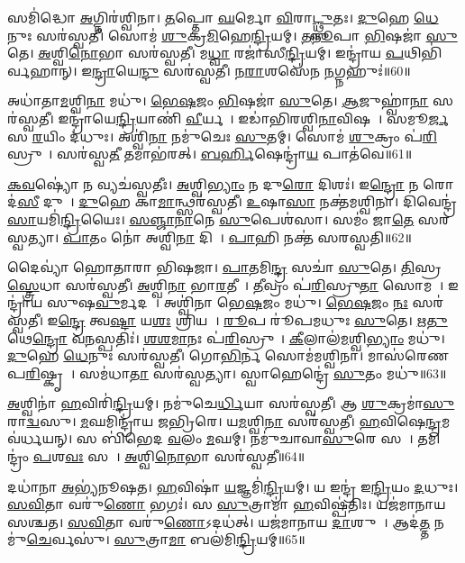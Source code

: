 𑌸𑌮𑌿॑𑌦𑍍𑌧𑍋 \ul{𑌅}𑌗𑍍𑌨𑌿𑌰॑𑌶𑍍𑌵𑌿𑌨𑌾।
\ul{𑌤}𑌪𑍍𑌤𑍋 \ul{𑌘}𑌰𑍍𑌮𑍋 \ul{𑌵𑌿}𑌰𑌾\ul{𑌟𑍍𑌥𑍍𑌸𑍁}𑌤𑌃।
\ul{𑌦𑍁}𑌹𑍇 \ul{𑌧𑍇}𑌨𑍁𑌃 𑌸𑌰॑𑌸𑍍𑌵𑌤𑍀।
𑌸𑍋𑌮॑ \ul{𑌶𑍁}𑌕𑍍𑌰\ul{𑌮𑌿}𑌹𑍇\ul{𑌨𑍍𑌦𑍍𑌰𑌿}𑌯𑌮𑍍।
\ul{𑌤}\ul{𑌨𑍂}𑌪𑌾 \ul{𑌭𑌿}𑌷𑌜𑌾॑ \ul{𑌸𑍁}𑌤𑍇।
\ul{𑌅}𑌶𑍍𑌵𑌿\ul{𑌨𑍋}𑌭𑌾 𑌸𑌰॑𑌸𑍍𑌵𑌤𑍀।
𑌮\ul{𑌧𑍍𑌵𑌾} 𑌰𑌜𑌾॑𑌸𑍀\ul{𑌨𑍍𑌦𑍍𑌰𑌿}𑌯𑌮𑍍।
𑌇𑌨𑍍𑌦𑍍𑌰𑌾॑𑌯 \ul{𑌪}𑌥𑌿𑌭𑌿॑𑌰𑍍𑌵𑌹𑌾𑌨𑍍।
𑌇\ul{𑌨𑍍𑌦𑍍𑌰𑌾}𑌯𑍇\ul{𑌨𑍍𑌦𑍁}\ul{} 𑌸𑌰॑𑌸𑍍𑌵𑌤𑍀।
𑌨\ul{𑌰𑌾}𑌶𑌸𑍇॑𑌨 \ul{𑌨}𑌗𑍍𑌨𑌹𑍁𑌃॑॥60॥

𑌅𑌧𑌾॑𑌤𑌾\ul{𑌮}𑌶𑍍𑌵𑌿\ul{𑌨𑌾} 𑌮𑌧𑍁॑।
\ul{𑌭𑍇}\ul{𑌷}𑌜𑌂 \ul{𑌭𑌿}𑌷𑌜𑌾॑ \ul{𑌸𑍁}𑌤𑍇।
\ul{𑌆}𑌜𑍁𑌹𑍍𑌵𑌾॑\ul{𑌨𑌾} 𑌸𑌰॑𑌸𑍍𑌵𑌤𑍀।
𑌇𑌨𑍍𑌦𑍍𑌰𑌾॑𑌯𑍇\ul{𑌨𑍍𑌦𑍍𑌰𑌿}𑌯𑌾𑌣𑌿॑ \ul{𑌵𑍀}𑌰𑍍𑌯𑌮𑍍᳚।
𑌇𑌡𑌾॑𑌭𑌿𑌰𑌶𑍍𑌵𑌿\ul{𑌨𑌾}𑌵𑌿𑌷𑌮𑍍᳚।
𑌸𑌮𑍂\ul{𑌰𑍍𑌜}\ul{} 𑌸 \ul{𑌰}𑌯𑌿𑌂 𑌦॑𑌧𑍁𑌃।
𑌅𑌶𑍍𑌵𑌿॑\ul{𑌨𑌾} 𑌨𑌮𑍁॑𑌚𑍇𑌃 \ul{𑌸𑍁}𑌤𑌮𑍍।
𑌸𑍋𑌮॑ \ul{𑌶𑍁}𑌕𑍍𑌰𑌂 𑌪॑\ul{𑌰𑌿}𑌸𑍍𑌰𑍁𑌤𑌾᳚।
𑌸𑌰॑𑌸𑍍𑌵\ul{𑌤𑍀} 𑌤𑌮𑌾𑌭॑𑌰𑌤𑍍।
\ul{𑌬}\ul{𑌰𑍍}𑌹𑌿𑌷𑍇𑌨𑍍𑌦𑍍𑌰𑌾॑\ul{𑌯} 𑌪𑌾𑌤॑𑌵𑍇॥61॥

\ul{𑌕}\ul{𑌵}𑌷𑍍𑌯𑍋॑ 𑌨 𑌵𑍍𑌯𑌚॑𑌸𑍍𑌵𑌤𑍀𑌃।
\ul{𑌅}𑌶𑍍𑌵𑌿\ul{𑌭𑍍𑌯𑌾𑌂} 𑌨 𑌦𑍁\ul{𑌰𑍋} 𑌦𑌿𑌶𑌃॑।
𑌇\ul{𑌨𑍍𑌦𑍍𑌰𑍋} 𑌨 𑌰𑍋𑌦॑\ul{𑌸𑍀} 𑌦𑍁𑌘𑍇᳚।
\ul{𑌦𑍁}𑌹𑍇 𑌕𑌾\ul{𑌮𑌾}𑌨𑍍𑌥𑍍𑌸𑌰॑𑌸𑍍𑌵𑌤𑍀।
\ul{𑌉}𑌷𑌾\ul{𑌸𑌾} 𑌨𑌕𑍍𑌤॑𑌮𑌶𑍍𑌵𑌿𑌨𑌾।
𑌦𑌿𑌵𑍇𑌨𑍍𑌦𑍍𑌰॑ \ul{𑌸𑌾}𑌯𑌮𑌿॑\ul{𑌨𑍍𑌦𑍍𑌰𑌿}𑌯𑍈𑌃।
\ul{𑌸}\ul{𑌞𑍍𑌜𑌾}\ul{𑌨𑌾}𑌨𑍇 \ul{𑌸𑍁}𑌪𑍇𑌶॑𑌸𑌾।
𑌸𑌮𑌂॑ 𑌜𑌾\ul{𑌤𑍇} 𑌸𑌰॑𑌸𑍍𑌵𑌤𑍍𑌯𑌾।
\ul{𑌪𑌾}𑌤𑌂 𑌨𑍋॑ 𑌅𑌶𑍍𑌵𑌿\ul{𑌨𑌾} 𑌦𑌿𑌵𑌾᳚।
\ul{𑌪𑌾}𑌹𑌿 𑌨𑌕𑍍𑌤॑ 𑌸𑌰𑌸𑍍𑌵𑌤𑌿॥62॥

𑌦𑍈𑌵𑍍𑌯𑌾॑ 𑌹𑍋𑌤𑌾𑌰𑌾 𑌭𑌿𑌷𑌜𑌾।
\ul{𑌪𑌾}𑌤𑌮𑌿\ul{𑌨𑍍𑌦𑍍𑌰}\ul{} 𑌸𑌚𑌾॑ \ul{𑌸𑍁}𑌤𑍇।
\ul{𑌤𑌿}𑌸𑍍𑌰\ul{𑌸𑍍𑌤𑍍𑌰𑍇}𑌧𑌾 𑌸𑌰॑𑌸𑍍𑌵𑌤𑍀।
\ul{𑌅}𑌶𑍍𑌵𑌿\ul{𑌨𑌾} 𑌭𑌾\ul{𑌰}𑌤𑍀𑌡𑌾᳚।
\ul{𑌤𑍀}𑌵𑍍𑌰𑌂 𑌪॑\ul{𑌰𑌿}𑌸𑍍𑌰𑍁\ul{𑌤𑌾} 𑌸𑍋𑌮𑌮𑍍᳚।
𑌇𑌨𑍍𑌦𑍍𑌰𑌾॑𑌯 𑌸𑍁𑌷\ul{𑌵𑍁}𑌰𑍍𑌮𑌦𑌮𑍍᳚।
𑌅𑌶𑍍𑌵𑌿॑𑌨𑌾 𑌭𑍇\ul{𑌷}𑌜𑌂 𑌮𑌧𑍁॑।
\ul{𑌭𑍇}\ul{𑌷}𑌜𑌂 \ul{𑌨𑌃} 𑌸𑌰॑𑌸𑍍𑌵𑌤𑍀।
𑌇\ul{𑌨𑍍𑌦𑍍𑌰𑍇} 𑌤𑍍𑌵\ul{𑌷𑍍𑌟𑌾} 𑌯\ul{𑌶𑌃} 𑌶𑍍𑌰𑌿𑌯𑌮𑍍᳚।
\ul{𑌰𑍂}𑌪 𑌰𑍂॑𑌪𑌮𑌧𑍁𑌃 \ul{𑌸𑍁}𑌤𑍇।
\ul{𑌋}\ul{𑌤𑍁}𑌥𑍇\ul{𑌨𑍍𑌦𑍍𑌰𑍋} 𑌵\ul{𑌨}𑌸𑍍𑌪𑌤𑌿𑌃॑।
\ul{𑌶}\ul{𑌶}\ul{𑌮𑌾}𑌨𑌃 𑌪॑\ul{𑌰𑌿}𑌸𑍍𑌰𑍁𑌤𑌾᳚।
\ul{𑌕𑍀}𑌲𑌾𑌲॑\ul{𑌮}𑌶𑍍𑌵𑌿\ul{𑌭𑍍𑌯𑌾𑌂} 𑌮𑌧𑍁॑।
\ul{𑌦𑍁}𑌹𑍇 \ul{𑌧𑍇}𑌨𑍁𑌃 𑌸𑌰॑𑌸𑍍𑌵𑌤𑍀।
𑌗𑍋\ul{𑌭𑌿}𑌰𑍍𑌨 𑌸𑍋𑌮॑𑌮𑌶𑍍𑌵𑌿𑌨𑌾।
𑌮𑌾𑌸॑𑌰𑍇𑌣 𑌪\ul{𑌰𑌿}𑌷𑍍𑌕𑍃𑌤𑌾᳚।
𑌸𑌮॑𑌧𑌾\ul{𑌤𑌾}\ul{} 𑌸𑌰॑𑌸𑍍𑌵𑌤𑍍𑌯𑌾।
𑌸𑍍𑌵𑌾𑌹𑍇𑌨𑍍𑌦𑍍𑌰𑍇॑ \ul{𑌸𑍁}𑌤𑌂 𑌮𑌧𑍁॑॥63॥\anuvakamend[\ul{𑌨}𑌗𑍍𑌨\ul{𑌹𑍁𑌃} 𑌪𑌾𑌤॑𑌵𑍇 𑌸𑌰𑌸𑍍𑌵𑌤𑍍𑌯𑌧𑍁𑌃 \ul{𑌸𑍁}𑌤𑍇᳚\-𑌽𑌷𑍍𑌟𑍗 𑌚॑]

\ul{𑌅}𑌶𑍍𑌵𑌿𑌨𑌾॑ \ul{𑌹}𑌵𑌿𑌰𑌿॑\ul{𑌨𑍍𑌦𑍍𑌰𑌿}𑌯𑌮𑍍।
𑌨𑌮𑍁॑𑌚𑍇\ul{𑌰𑍍𑌧𑌿}𑌯𑌾 𑌸𑌰॑𑌸𑍍𑌵𑌤𑍀।
𑌆 \ul{𑌶𑍁}𑌕𑍍𑌰𑌮𑌾॑\ul{𑌸𑍁}𑌰𑌾\ul{𑌦𑍍𑌵}𑌸𑍁।
\ul{𑌮}𑌘𑌮𑌿𑌨𑍍𑌦𑍍𑌰𑌾॑𑌯 𑌜𑌭𑍍𑌰𑌿𑌰𑍇।
𑌯\ul{𑌮}𑌶𑍍𑌵𑌿\ul{𑌨𑌾} 𑌸𑌰॑𑌸𑍍𑌵𑌤𑍀।
\ul{𑌹}𑌵𑌿𑌷𑍇\ul{𑌨𑍍𑌦𑍍𑌰}𑌮𑌵॑𑌰𑍍𑌧𑌯𑌨𑍍।
𑌸 𑌬𑌿॑𑌭𑍇𑌦 \ul{𑌵}𑌲𑌂 \ul{𑌮}𑌘𑌮𑍍।
𑌨𑌮𑍁॑𑌚𑌾𑌵𑌾\ul{𑌸𑍁}𑌰𑍇 𑌸𑌚𑌾᳚।
𑌤𑌮𑌿𑌨𑍍𑌦𑍍𑌰𑌂॑ \ul{𑌪}𑌶\ul{𑌵𑌃} 𑌸𑌚𑌾᳚।
\ul{𑌅}𑌶𑍍𑌵𑌿\ul{𑌨𑍋}𑌭𑌾 𑌸𑌰॑𑌸𑍍𑌵𑌤𑍀॥64॥

𑌦𑌧𑌾॑𑌨𑌾 \ul{𑌅}𑌭𑍍𑌯॑𑌨𑍂𑌷𑌤।
\ul{𑌹}𑌵𑌿𑌷𑌾॑ \ul{𑌯}𑌜𑍍𑌞𑌮𑌿॑\ul{𑌨𑍍𑌦𑍍𑌰𑌿}𑌯𑌮𑍍।
𑌯 𑌇𑌨𑍍𑌦𑍍𑌰॑ 𑌇\ul{𑌨𑍍𑌦𑍍𑌰𑌿}𑌯𑌂 \ul{𑌦}𑌧𑍁𑌃।
\ul{𑌸}\ul{𑌵𑌿}𑌤𑌾 𑌵𑌰𑍁॑\ul{𑌣𑍋} 𑌭𑌗𑌃॑।
𑌸 \ul{𑌸𑍁}𑌤𑍍𑌰𑌾𑌮𑌾॑ \ul{𑌹}𑌵𑌿𑌷𑍍𑌪॑𑌤𑌿𑌃।
𑌯𑌜॑𑌮𑌾𑌨𑌾𑌯 𑌸𑌶𑍍𑌚𑌤।
\ul{𑌸}\ul{𑌵𑌿}𑌤𑌾 𑌵𑌰𑍁॑\ul{𑌣𑍋}\-𑌽𑌦𑌧॑𑌤𑍍।
𑌯𑌜॑𑌮𑌾𑌨𑌾𑌯 \ul{𑌦𑌾}𑌶𑍁𑌷𑍇᳚।
𑌆𑌦॑\ul{𑌤𑍍𑌤} 𑌨𑌮𑍁॑\ul{𑌚𑍇}𑌰𑍍𑌵𑌸𑍁॑।
\ul{𑌸𑍁}𑌤𑍍𑌰𑌾\ul{𑌮𑌾} 𑌬𑌲॑𑌮𑌿\ul{𑌨𑍍𑌦𑍍𑌰𑌿}𑌯𑌮𑍍॥65॥

